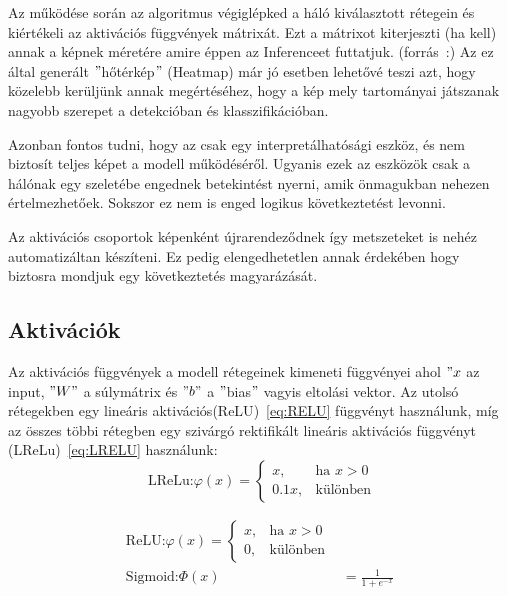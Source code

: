 \documentclass[12pt,oneside,a4paper]{article}
\theoremstyle{remark}
\begin{document}
	Az  működése során az algoritmus végiglépked a háló kiválasztott rétegein és kiértékeli
	az aktivációs függvények mátrixát.
	Ezt a mátrixot kiterjeszti (ha kell) annak a képnek méretére amire éppen az \gls{Inference}et futtatjuk.
	(forrás~\cite{muhammad2020eigencam}:)
	Az ez által generált \("\)hőtérkép\("\) (Heatmap) már jó esetben lehetővé teszi azt, hogy közelebb kerüljünk
	annak megértéséhez, hogy a kép mely tartományai játszanak nagyobb szerepet a detekcióban és klasszifikációban.
	
	Azonban fontos tudni, hogy az  csak egy interpretálhatósági eszköz, és nem biztosít teljes képet
	a modell működéséről.
	Ugyanis ezek az eszközök csak a hálónak egy szeletébe engednek betekintést nyerni, amik önmagukban nehezen értelmezhetőek.
	Sokszor ez nem is enged logikus következtetést levonni.
	
	Az aktivációs csoportok képenként újrarendeződnek így metszeteket is nehéz automatizáltan készíteni.
	Ez pedig elengedhetetlen annak érdekében hogy biztosra mondjuk egy következtetés magyarázását.
	
	
	
	\subsection{Aktivációk}\label{subsec:activations}
	Az aktivációs függvények a modell rétegeinek kimeneti függvényei ahol \("x\) az input, \("W"\) a súlymátrix és \("b"\) a
	\("\)bias\("\) vagyis eltolási vektor.
	Az utolsó rétegekben egy lineáris aktivációs(\ac{ReLU})~\eqref{eq:RELU}\label{alignhivatkozas} függvényt használunk,
	míg az összes többi rétegben egy
	szivárgó rektifikált lineáris aktivációs függvényt (\ac{LReLu})~\eqref{eq:LRELU}\label{eqhivatkozas} használunk:
	\begin{equation}
		\text{ LReLu:}
		\varphi(x) = \begin{cases}
			x, & \text{ha } x > 0 \\
			0.1x, & \text{különben}
		\end{cases}\label{eq:LRELU}
	\end{equation}\label{eq:activation_functions}
	
	
	\begin{align}
		\text{ReLU:}
		\varphi(x)=\begin{cases}
			x, & \text{ha } x > 0 \\
			0, & \text{különben} \end{cases}\label{eq:RELU} \\
		\text{Sigmoid:}
		\varPhi(x) &= \frac{1}{1 + e^{-x}} \label{eq:Sigmoid}
	\end{align}
	
\end{document}
